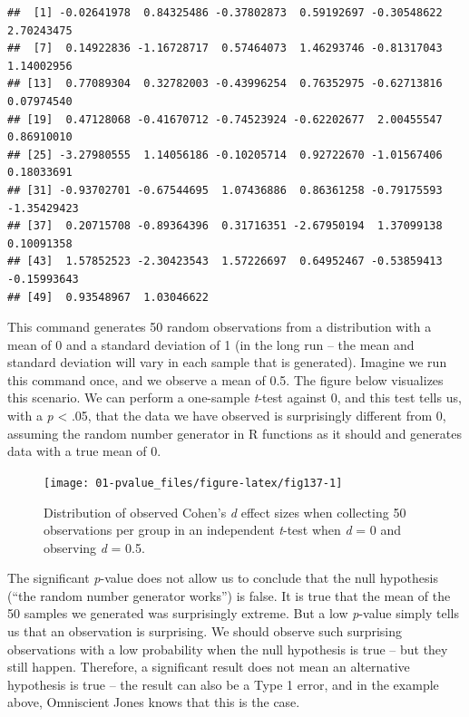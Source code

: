 \documentclass[
  oneside]{book}
\begin{document}
\begin{verbatim}
##  [1] -0.02641978  0.84325486 -0.37802873  0.59192697 -0.30548622  2.70243475
##  [7]  0.14922836 -1.16728717  0.57464073  1.46293746 -0.81317043  1.14002956
## [13]  0.77089304  0.32782003 -0.43996254  0.76352975 -0.62713816  0.07974540
## [19]  0.47128068 -0.41670712 -0.74523924 -0.62202677  2.00455547  0.86910010
## [25] -3.27980555  1.14056186 -0.10205714  0.92722670 -1.01567406  0.18033691
## [31] -0.93702701 -0.67544695  1.07436886  0.86361258 -0.79175593 -1.35429423
## [37]  0.20715708 -0.89364396  0.31716351 -2.67950194  1.37099138  0.10091358
## [43]  1.57852523 -2.30423543  1.57226697  0.64952467 -0.53859413 -0.15993643
## [49]  0.93548967  1.03046622
\end{verbatim}

This command generates 50 random observations from a distribution with a mean of 0 and a standard deviation of 1 (in the long run -- the mean and standard deviation will vary in each sample that is generated). Imagine we run this command once, and we observe a mean of 0.5. The figure below visualizes this scenario. We can perform a one-sample \emph{t}-test against 0, and this test tells us, with a \emph{p} \textless{} .05, that the data we have observed is surprisingly different from 0, assuming the random number generator in R functions as it should and generates data with a true mean of 0.



\begin{figure}

{\centering \texttt{[image: 01-pvalue\_files/figure-latex/fig137-1]} 

}

\caption{Distribution of observed Cohen's \emph{d} effect sizes when collecting 50 observations per group in an independent \emph{t}-test when \emph{d} = 0 and observing \emph{d} = 0.5.}\label{fig:fig137}
\end{figure}

The significant \emph{p}-value does not allow us to conclude that the null hypothesis (``the random number generator works'') is false. It is true that the mean of the 50 samples we generated was surprisingly extreme. But a low \emph{p}-value simply tells us that an observation is surprising. We should observe such surprising observations with a low probability when the null hypothesis is true -- but they still happen. Therefore, a significant result does not mean an alternative hypothesis is true -- the result can also be a Type 1 error, and in the example above, Omniscient Jones knows that this is the case.
\end{document}

